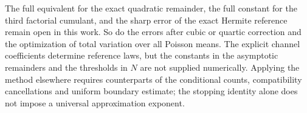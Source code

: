 The full equivalent for the exact quadratic remainder, the full
constant for the third factorial cumulant, and the sharp error of
the exact Hermite reference remain open in this work. So do the
errors after cubic or quartic correction and the optimization of
total variation over all Poisson means. The explicit channel
coefficients determine reference laws, but the constants in the
asymptotic remainders and the thresholds in \(N\) are not supplied
numerically. Applying the method elsewhere requires counterparts
of the conditional counts, compatibility cancellations and uniform
boundary estimate; the stopping identity alone does not impose a
universal approximation exponent.
